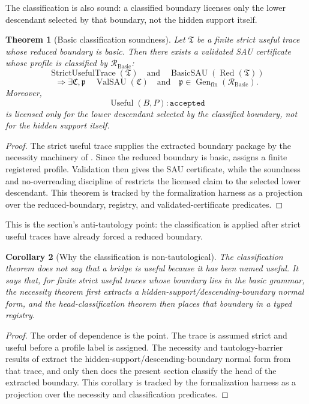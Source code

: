 \documentclass[11pt]{article}
\newcommand{\Use}{\operatorname{Useful}}
\newcommand{\ValSAU}{\operatorname{ValSAU}}
\newcommand{\Red}{\operatorname{Red}}
\newcommand{\Basic}{\operatorname{Basic}}
\newcommand{\Gen}{\operatorname{Gen}}
\newcommand{\BasicSAU}{\operatorname{BasicSAU}}
\newtheorem{theorem}{Theorem}[section]
\newtheorem{corollary}[theorem]{Corollary}
\theoremstyle{definition}
\begin{document}
The classification is also sound: a classified boundary licenses only the lower
descendant selected by that boundary, not the hidden support itself.

\begin{theorem}[Basic classification soundness]
\label{thm:sau-basic-classification-soundness}
Let \(\mathfrak T\) be a finite strict useful trace whose reduced boundary is basic.  Then there exists a validated SAU certificate whose profile is classified by \(\mathcal R_{\Basic}\):
\[
\operatorname{StrictUsefulTrace}(\mathfrak T)
\quad\text{and}\quad
\BasicSAU(\Red(\mathfrak T))
\]
\[
\Longrightarrow
\exists \mathfrak C,\mathfrak p
\quad
\ValSAU(\mathfrak C)
\quad\text{and}\quad
\mathfrak p\in\Gen_{\mathrm{fin}}(\mathcal R_{\Basic}).
\]
Moreover,
\[
\Use(B,P):\texttt{accepted}
\]
is licensed only for the lower descendant selected by the classified boundary, not for the hidden support itself.
\end{theorem}

\begin{proof}
The strict useful trace supplies the extracted boundary package by the necessity
machinery of .  Since the reduced boundary is basic,
 assigns a finite registered
profile.  Validation then gives the SAU certificate, while the soundness and
no-overreading discipline of  restricts the licensed
claim to the selected lower descendant.  This theorem is tracked by the
formalization harness as a projection over the reduced-boundary, registry, and
validated-certificate predicates.
\end{proof}

This is the section's anti-tautology point: the classification is applied after
strict useful traces have already forced a reduced boundary.

\begin{corollary}[Why the classification is non-tautological]
\label{cor:sau-classification-nontautological}
The classification theorem does not say that a bridge is useful because it has been named useful.  It says that, for finite strict useful traces whose boundary lies in the basic grammar, the necessity theorem first extracts a hidden-support/descending-boundary normal form, and the head-classification theorem then places that boundary in a typed registry.
\end{corollary}

\begin{proof}
The order of dependence is the point.  The trace is assumed strict and useful
before a profile label is assigned.  The necessity and tautology-barrier results
of  extract the hidden-support/descending-boundary normal
form from that trace, and only then does the present section classify the head of
the extracted boundary.  This corollary is tracked by the formalization harness
as a projection over the necessity and classification predicates.
\end{proof}
\end{document}
